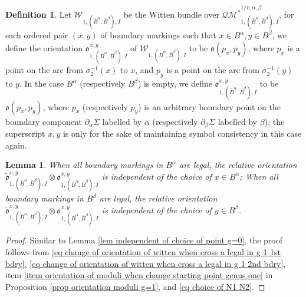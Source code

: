 \documentclass[11pt,a4paper]{article}
\newtheorem{lem}[dummy]{Lemma}
\theoremstyle{definition}
\newtheorem{dfn}[dummy]{Definition}
\theoremstyle{remark}
\numberwithin{equation}{section}
\begin{document}
\begin{dfn}
    Let $\mathcal W_{1,(\bar{B}^\alpha,\bar{B}^\beta),I}$ be the Witten bundle over $\overline{\mathcal {QM}^*}^{1/r,\alpha,\beta}_{1,(\bar{B}^\alpha,\bar{B}^\beta),I}$, for each ordered pair $(x,y)$ of boundary markings such that $x\in B^\alpha,y\in B^\beta$, we define the orientation $\mathfrak o^{x,y}_{1,(\bar{B}^\alpha,\bar{B}^\beta),I}$ of $\mathcal W_{1,(\bar{B}^\alpha,\bar{B}^\beta),I}$ to be $\mathfrak o(p_x,p_y)$, where $p_x$ is a point on the arc from  $\sigma_2^{-1}(x)$ to $x$, and $p_y$ is a point on the arc from  $\sigma_2^{-1}(y)$ to $y$. In the case $B^\alpha$ (respectively $B^\beta$) is empty, we define $\mathfrak o^{x,y}_{1,(\bar{B}^\alpha,\bar{B}^\beta),I}$ to be $\mathfrak o(p_x,p_y)$, where $p_x$ (respectively $p_y$) is an arbitrary boundary point on the boundary  component $\partial_\alpha \Sigma$ labelled by $\alpha$ (respectively $\partial_\beta \Sigma$ labelled by $\beta$); the superscript $x,y$ is only for the sake of maintaining symbol consistency in this case again.
\end{dfn}


\begin{lem}\label{lem independent of choice of point g=1}
When all boundary markings in $B^\alpha$ are legal, the relative orientation $\tilde{\mathfrak o}^{x,y}_{1,(\bar B^\alpha, \bar B^\beta ),I}\otimes {\mathfrak o}^{x,y}_{1,(\bar B^\alpha, \bar B^\beta ),I}$ is independent of the choice of $x\in B^\alpha$; When all boundary markings in $B^\beta$ are legal, the relative orientation $\tilde{\mathfrak o}^{x,y}_{1,(\bar B^\alpha, \bar B^\beta ),I}\otimes {\mathfrak o}^{x,y}_{1,(\bar B^\alpha, \bar B^\beta ),I}$ is independent of the choice of $y\in B^\beta$.
\end{lem}

\begin{proof}
       Similar to Lemma \ref{lem independent of choice of point g=0}, the proof follows from \eqref{eq change of orientation of witten when cross a legal in g 1 1st bdry}, \eqref{eq change of orientation of witten when cross a legal in g 1 2nd bdry}, item \ref{item orientation of moduli when change starting point genus one} in Proposition \ref{prop orientation moduli g=1}, and \eqref{eq choice of N1 N2}.
\end{proof}
\end{document}
